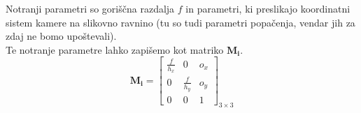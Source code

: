 Notranji parametri so goriščna razdalja $f$ in parametri, ki preslikajo koordinatni sistem kamere na slikovno ravnino (tu so tudi parametri popačenja, vendar jih za zdaj ne bomo upoštevali). \\
Te notranje parametre lahko zapišemo kot matriko $\pmb{M_i}$.\[
    \pmb{M_i} = 
    \begin{bmatrix}
        \frac{f}{h_x} & 0 & o_x \\
        0 & \frac{f}{h_y} & o_y \\
        0 & 0 & 1
    \end{bmatrix}_{3\times3}
\]